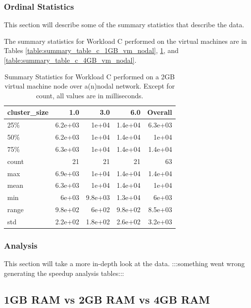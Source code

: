 \subsubsection{Ordinal Statistics}
This section will describe some of the summary statistics that describe the data.  

The summary statistics for Workload C performed on the virtual machines are in Tables \ref{table:summary_table_c_1GB_vm_nodal}, \ref{table:summary_table_c_2GB_vm_nodal}, and \ref{table:summary_table_c_4GB_vm_nodal}.
\begin{table}
\begin{tabular}{lrrrr}
\toprule
cluster\_size &     1.0 &     3.0 &     6.0 &  Overall \\
\midrule
25\%   & 6.2e+03 &   1e+04 & 1.4e+04 &  6.3e+03 \\
50\%   & 6.2e+03 &   1e+04 & 1.4e+04 &    1e+04 \\
75\%   & 6.3e+03 &   1e+04 & 1.4e+04 &  1.4e+04 \\
count &      21 &      21 &      21 &       63 \\
max   & 6.9e+03 &   1e+04 & 1.4e+04 &  1.4e+04 \\
mean  & 6.3e+03 &   1e+04 & 1.4e+04 &    1e+04 \\
min   &   6e+03 & 9.8e+03 & 1.3e+04 &    6e+03 \\
range & 9.8e+02 &   6e+02 & 9.8e+02 &  8.5e+03 \\
std   & 2.2e+02 & 1.8e+02 & 2.6e+02 &  3.2e+03 \\
\bottomrule
\end{tabular}
\caption{Summary Statistics for Workload C performed on a 2GB virtual machine node over a(n)nodal network.  Except for count, all values are in milliseconds.}
\label{table:summary_table_c_2GB_vm_nodal}
\end{table}



\subsubsection{Analysis}
This section will take a more in-depth look at the data.
:::something went wrong generating the speedup analysis tables:::

\subsection{1GB RAM vs 2GB RAM vs 4GB RAM}
